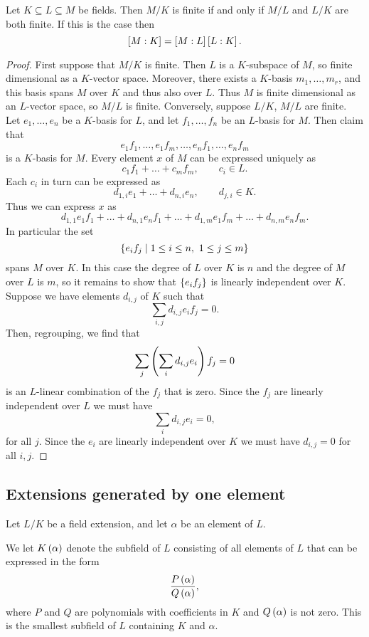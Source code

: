 \begin{proposition}
Let $ K \subseteq L \subseteq M $ be fields. Then $ M / K $ is finite if and only if $ M / L $ and $ L / K $ are both finite. If this is the case then
$$ \sb{M : K} = \sb{M : L}\sb{L : K}. $$
\end{proposition}

\begin{proof}
First suppose that $ M / K $ is finite. Then $ L $ is a $ K $-subspace of $ M $, so finite dimensional as a $ K $-vector space. Moreover, there exists a $ K $-basis $ m_1, \dots, m_r $, and this basis spans $ M $ over $ K $ and thus also over $ L $. Thus $ M $ is finite dimensional as an $ L $-vector space, so $ M / L $ is finite. Conversely, suppose $ L / K $, $ M / L $ are finite. Let $ e_1, \dots, e_n $ be a $ K $-basis for $ L $, and let $ f_1, \dots, f_n $ be an $ L $-basis for $ M $. Then claim that
$$ e_1f_1, \dots, e_1f_m, \dots, e_nf_1, \dots, e_nf_m $$
is a $ K $-basis for $ M $. Every element $ x $ of $ M $ can be expressed uniquely as
$$ c_1f_1 + \dots + c_mf_m, \qquad c_i \in L. $$
Each $ c_i $ in turn can be expressed as
$$ d_{1, i}e_1 + \dots + d_{n, i}e_n, \qquad d_{j, i} \in K. $$
Thus we can express $ x $ as
$$ d_{1, 1}e_1f_1 + \dots + d_{n, 1}e_nf_1 + \dots + d_{1, m}e_1f_m + \dots + d_{n, m}e_nf_m. $$
In particular the set
$$ \cb{e_if_j \mid 1 \le i \le n, \ 1 \le j \le m} $$
spans $ M $ over $ K $. In this case the degree of $ L $ over $ K $ is $ n $ and the degree of $ M $ over $ L $ is $ m $, so it remains to show that $ \cb{e_if_j} $ is linearly independent over $ K $. Suppose we have elements $ d_{i, j} $ of $ K $ such that
$$ \sum_{i, j} d_{i, j}e_if_j = 0. $$
Then, regrouping, we find that
$$ \sum_j \rb{\sum_i d_{i, j}e_i}f_j = 0 $$
is an $ L $-linear combination of the $ f_j $ that is zero. Since the $ f_j $ are linearly independent over $ L $ we must have
$$ \sum_i d_{i, j}e_i = 0, $$
for all $ j $. Since the $ e_i $ are linearly independent over $ K $ we must have $ d_{i, j} = 0 $ for all $ i, j $.
\end{proof}


\subsection{Extensions generated by one element}

Let $ L / K $ be a field extension, and let $ \alpha $ be an element of $ L $.

\begin{definition}
We let $ K\rb{\alpha} $ denote the subfield of $ L $ consisting of all elements of $ L $ that can be expressed in the form
$$ \dfrac{P\rb{\alpha}}{Q\rb{\alpha}}, $$
where $ P $ and $ Q $ are polynomials with coefficients in $ K $ and $ Q\rb{\alpha} $ is not zero. This is the smallest subfield of $ L $ containing $ K $ and $ \alpha $.
\end{definition}

